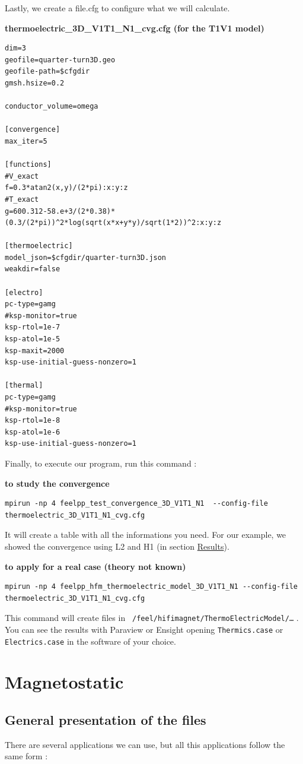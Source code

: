 \documentclass[11pt]{amsart}
\begin{document}
Lastly, we create a file.cfg to configure what we will calculate.


{\bf \hypertarget{example-file.cfg}{thermoelectric\_3D\_V1T1\_N1\_cvg.cfg (for the T1V1 model)}}\vspace{-1\baselineskip}
\begin{verbatim}
dim=3
geofile=quarter-turn3D.geo
geofile-path=$cfgdir
gmsh.hsize=0.2

conductor_volume=omega

[convergence]
max_iter=5

[functions]
#V_exact
f=0.3*atan2(x,y)/(2*pi):x:y:z
#T_exact
g=600.312-58.e+3/(2*0.38)*(0.3/(2*pi))^2*log(sqrt(x*x+y*y)/sqrt(1*2))^2:x:y:z

[thermoelectric]
model_json=$cfgdir/quarter-turn3D.json
weakdir=false

[electro]
pc-type=gamg
#ksp-monitor=true
ksp-rtol=1e-7
ksp-atol=1e-5
ksp-maxit=2000
ksp-use-initial-guess-nonzero=1

[thermal]
pc-type=gamg
#ksp-monitor=true
ksp-rtol=1e-8
ksp-atol=1e-6
ksp-use-initial-guess-nonzero=1
\end{verbatim}

Finally, to execute our program, run this command :


{\bf to study the convergence}\vspace{-1\baselineskip}
\begin{verbatim}
mpirun -np 4 feelpp_test_convergence_3D_V1T1_N1  --config-file thermoelectric_3D_V1T1_N1_cvg.cfg
\end{verbatim}

It will create a table with all the informations you need. For our example, we showed the convergence using L2 and H1 (in section \hyperlink{x-results}{Results}).


{\bf to apply for a real case (theory not known)}\vspace{-1\baselineskip}
\begin{verbatim}
mpirun -np 4 feelpp_hfm_thermoelectric_model_3D_V1T1_N1 --config-file thermoelectric_3D_V1T1_N1_cvg.cfg
\end{verbatim}

This command will create files in \texttt{~/feel/hifimagnet/ThermoElectricModel/…​} . You can see the results with Paraview or Ensight opening \texttt{Thermics.case} or \texttt{Electrics.case} in the software of your choice.


\hypertarget{x-\textbf{magnetostatic}}{\section{\textbf{Magnetostatic}}}
\hypertarget{x-general-presentation-of-the-files}{\subsection{General presentation of the files}}
There are several applications we can use, but all this applications follow the same form :
\end{document}
